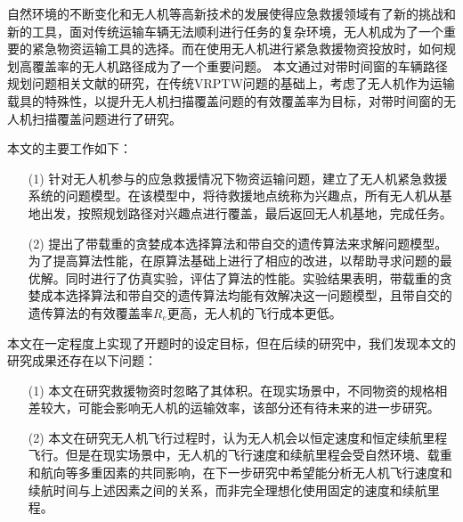 
\begin{conclusions}
自然环境的不断变化和无人机等高新技术的发展使得应急救援领域有了新的挑战和新的工具，面对传统运输车辆无法顺利进行任务的复杂环境，无人机成为了一个重要的紧急物资运输工具的选择。而在使用无人机进行紧急救援物资投放时，如何规划高覆盖率的无人机路径成为了一个重要问题。
本文通过对带时间窗的车辆路径规划问题相关文献的研究，在传统VRPTW问题的基础上，考虑了无人机作为运输载具的特殊性，以提升无人机扫描覆盖问题的有效覆盖率为目标，对带时间窗的无人机扫描覆盖问题进行了研究。


本文的主要工作如下：
\begin{itemize}
	\item [(1)] 针对无人机参与的应急救援情况下物资运输问题，建立了无人机紧急救援系统的问题模型。在该模型中，将待救援地点统称为兴趣点，所有无人机从基地出发，按照规划路径对兴趣点进行覆盖，最后返回无人机基地，完成任务。
 	\item [(2)] 提出了带载重的贪婪成本选择算法和带自交的遗传算法来求解问题模型。为了提高算法性能，在原算法基础上进行了相应的改进，以帮助寻求问题的最优解。同时进行了仿真实验，评估了算法的性能。实验结果表明，带载重的贪婪成本选择算法和带自交的遗传算法均能有效解决这一问题模型，且带自交的遗传算法的有效覆盖率$R_e$更高，无人机的飞行成本更低。
\end{itemize}


本文在一定程度上实现了开题时的设定目标，但在后续的研究中，我们发现本文的研究成果还存在以下问题：
\begin{itemize}
	\item [(1)] 本文在研究救援物资时忽略了其体积。在现实场景中，不同物资的规格相差较大，可能会影响无人机的运输效率，该部分还有待未来的进一步研究。
 	\item [(2)] 本文在研究无人机飞行过程时，认为无人机会以恒定速度和恒定续航里程飞行。但是在现实场景中，无人机的飞行速度和续航里程会受自然环境、载重和航向等多重因素的共同影响，在下一步研究中希望能分析无人机飞行速度和续航时间与上述因素之间的关系，而非完全理想化使用固定的速度和续航里程。
\end{itemize}

\end{conclusions}